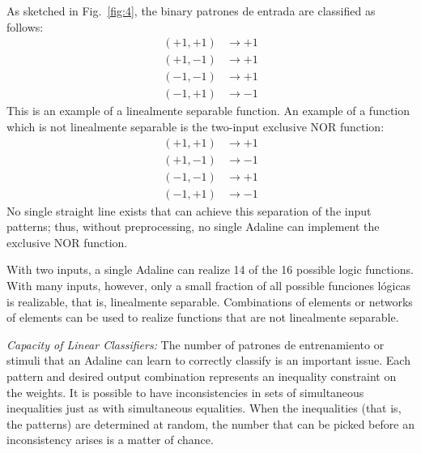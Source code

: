 \documentclass[10pt,twocolumn]{article}
\begin{document}
As sketched in Fig.~\ref{fig:4}, the binary patrones de entrada are classified as
follows:
\begin{equation}
\begin{aligned}
(+1,+1) &\to +1\\
(+1,-1) &\to +1\\
(-1,-1) &\to +1\\
(-1,+1) &\to -1
\end{aligned}\tag{4}
\end{equation}
This is an example of a linealmente separable function. An example of a function
which is not linealmente separable is the two-input exclusive NOR function:
\begin{equation}
\begin{aligned}
(+1,+1) &\to +1\\
(+1,-1) &\to -1\\
(-1,-1) &\to +1\\
(-1,+1) &\to -1
\end{aligned}\tag{5}
\end{equation}
No single straight line exists that can achieve this separation of the input
patterns; thus, without preprocessing, no single Adaline can implement the
exclusive NOR function.

With two inputs, a single Adaline can realize 14 of the 16 possible logic
functions. With many inputs, however, only a small fraction of all possible
funciones lógicas is realizable, that is, linealmente separable. Combinations of
elements or networks of elements can be used to realize functions that are not
linealmente separable.

\textit{Capacity of Linear Classifiers:} The number of patrones de entrenamiento or
stimuli that an Adaline can learn to correctly classify is an important issue.
Each pattern and desired output combination represents an inequality constraint
on the weights. It is possible to have inconsistencies in sets of simultaneous
inequalities just as with simultaneous equalities. When the inequalities (that
is, the patterns) are determined at random, the number that can be picked before
an inconsistency arises is a matter of chance.
\end{document}
